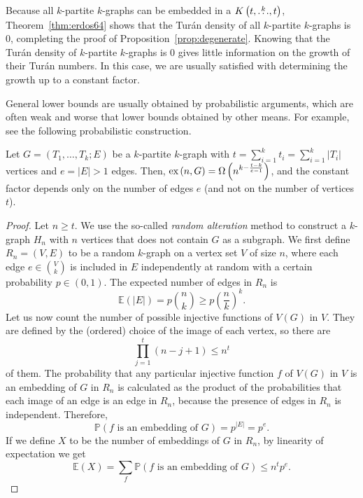 Because all $k$-partite $k$-graphs can be embedded in a $K\left(t, \overset{k}{\dots}, t\right)$,
Theorem~\ref{thm:erdos64} shows that the Turán density of all $k$-partite $k$-graphs is $0$,
completing the proof of Proposition~\ref{prop:degenerate}.
Knowing that the Turán density of $k$-partite $k$-graphs is $0$
gives little information on the growth of their Turán numbers.
In this case, we are usually satisfied with determining the growth up to a constant factor.

General lower bounds are usually obtained by probabilistic arguments,
which are often weak and worse that lower bounds obtained by other means.
For example, see the following probabilistic construction.

\begin{proposition} \label{prop:probabilistic-lower-bound}
    Let $G = (T_1, \dots, T_k; E)$ be a $k$-partite $k$-graph with
    $t = \sum_{i=1}^{k} t_i = \sum_{i=1}^{k} |T_i|$ vertices
    and $e = |E| > 1$ edges.
    Then, $\text{ex} \left( n, G \right) = \Omega\left(n^{k - \frac{t - k}{e - 1}} \right)$, and the
    constant factor depends only on the number of edges $e$ (and not on the number of vertices $t$).
    \begin{proof}
        Let $n \geq t$.
        We use the so-called \emph{random alteration} method to construct a $k$-graph
        $H_n$ with $n$ vertices that does not contain $G$ as a subgraph.
        We first define $R_n = (V, E)$ to be a random $k$-graph on a vertex set $V$ of size $n$,
        where each edge $e \in \binom{V}{k}$ is included in $E$ independently at random
        with a certain probability $p \in (0, 1)$.
        The expected number of edges in $R_n$ is
        \[
            \mathbb{E}(|E|) = p \binom{n}{k} \geq p \left( \frac{n}{k} \right)^k.
        \]
        Let us now count the number of possible injective functions of $V(G)$ in $V$.
        They are defined by the (ordered) choice of the image of each vertex, so there are
        \[
            \prod_{j=1}^{t} (n - j + 1) \leq n^t
        \]
        of them.
        The probability that any particular injective function $f$ of $V(G)$ in $V$ is an embedding of $G$ in $R_n$
        is calculated as the product of the probabilities that each image of an edge is an edge in $R_n$,
        because the presence of edges in $R_n$ is independent.
        Therefore,
        \[
            \mathbb{P}(f \text{ is an embedding of } G) = p^{|E|} = p^{e}.
        \]
        If we define $X$ to be the number of embeddings of $G$ in $R_n$, by linearity of expectation we get
        \[
            \mathbb{E}(X) = \sum_{f} \mathbb{P}(f \text{ is an embedding of } G) \leq n^t p^{e}.
\]
\end{proof}
\end{proposition}
